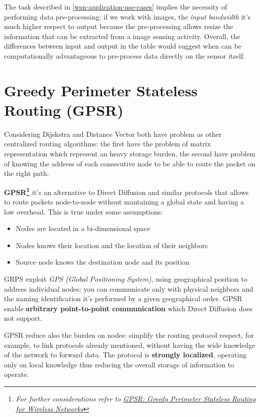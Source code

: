 \documentclass[10pt,a4paper]{report}
\theoremstyle{definition}
\begin{document}
The task described in \ref{wsn-application-use-cases} implies the necessity of performing data pre-processing: if we work with images, the \textit{input bandwidth} it's much higher respect to output because the pre-processing allows resize the information that can be extracted from a image sensing activity. Overall, the differences between input and output in the table would suggest when can be computationally advantageous to pre-process data directly on the sensor itself.\\

\section{Greedy Perimeter Stateless Routing (GPSR)}\label{sec:greedy-perimeter-stateless-routing-gpsr}
Considering Dijskstra and Distance Vector both have problem as other centralized routing algorithms: the first have the problem of matrix representation which represent an heavy storage burden, the second have problem of knowing the address of each consecutive node to be able to route the packet on the right path.

\textbf{GPSR\footnote{\textit{For further considerations refer to \href{https://www.eecs.harvard.edu/~htk/publication/2000-mobi-karp-kung.pdf}{GPSR: Greedy Perimeter Stateless Routing for Wireless Networks}}}} it's an alternative to Direct Diffusion and similar protocols that allows to route packets node-to-node without mantaining a global state and having a low overhead.
This is true under some assumptions:
\begin{itemize}
	\item 
	Nodes are located in a bi-dimensional space
	\item 
	Nodes knows their location and the location of their neighbors
	\item 
	Source node knows the destination node and its position
\end{itemize}

GRPS exploit \textit{GPS (Global Positioning System)}, using geographical position to address individual nodes: you can communicate only with physical neighbors and the naming identification it's performed by a given geographical order.
GPSR enable \textbf{arbitrary point-to-point communication} which Direct Diffusion does not support.

GPSR reduce also the burden on nodes: simplify the routing protocol respect, for example, to link protocols already mentioned, without having the wide knowledge of the network to forward data. The protocol is \textbf{strongly localized}, operating only on local knowledge thus reducing the overall storage of information to operate.
\end{document}
